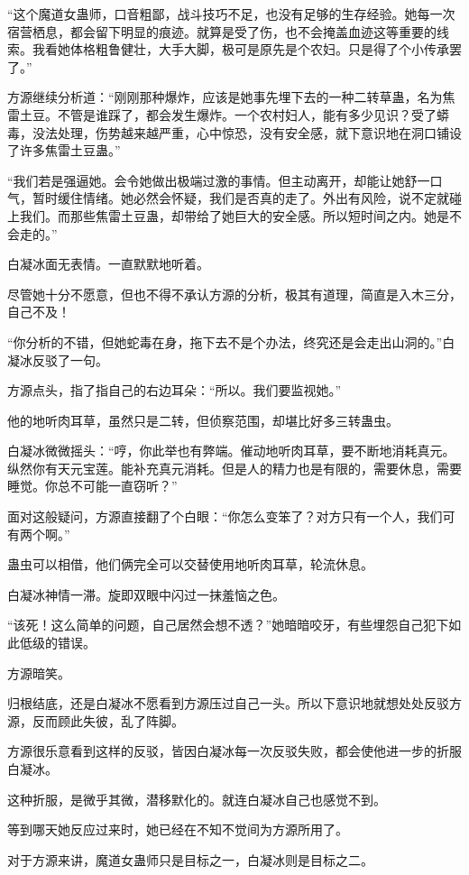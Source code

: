 \begin{this_body}
“这个魔道女蛊师，口音粗鄙，战斗技巧不足，也没有足够的生存经验。她每一次宿营栖息，都会留下明显的痕迹。就算是受了伤，也不会掩盖血迹这等重要的线索。我看她体格粗鲁健壮，大手大脚，极可是原先是个农妇。只是得了个小传承罢了。”

方源继续分析道：“刚刚那种爆炸，应该是她事先埋下去的一种二转草蛊，名为焦雷土豆。不管是谁踩了，都会发生爆炸。一个农村妇人，能有多少见识？受了蟒毒，没法处理，伤势越来越严重，心中惊恐，没有安全感，就下意识地在洞口铺设了许多焦雷土豆蛊。”

“我们若是强逼她。会令她做出极端过激的事情。但主动离开，却能让她舒一口气，暂时缓住情绪。她必然会怀疑，我们是否真的走了。外出有风险，说不定就碰上我们。而那些焦雷土豆蛊，却带给了她巨大的安全感。所以短时间之内。她是不会走的。”

白凝冰面无表情。一直默默地听着。

尽管她十分不愿意，但也不得不承认方源的分析，极其有道理，简直是入木三分，自己不及！

“你分析的不错，但她蛇毒在身，拖下去不是个办法，终究还是会走出山洞的。”白凝冰反驳了一句。

方源点头，指了指自己的右边耳朵：“所以。我们要监视她。”

他的地听肉耳草，虽然只是二转，但侦察范围，却堪比好多三转蛊虫。

白凝冰微微摇头：“哼，你此举也有弊端。催动地听肉耳草，要不断地消耗真元。纵然你有天元宝莲。能补充真元消耗。但是人的精力也是有限的，需要休息，需要睡觉。你总不可能一直窃听？”

面对这般疑问，方源直接翻了个白眼：“你怎么变笨了？对方只有一个人，我们可有两个啊。”

蛊虫可以相借，他们俩完全可以交替使用地听肉耳草，轮流休息。

白凝冰神情一滞。旋即双眼中闪过一抹羞恼之色。

“该死！这么简单的问题，自己居然会想不透？”她暗暗咬牙，有些埋怨自己犯下如此低级的错误。

方源暗笑。

归根结底，还是白凝冰不愿看到方源压过自己一头。所以下意识地就想处处反驳方源，反而顾此失彼，乱了阵脚。

方源很乐意看到这样的反驳，皆因白凝冰每一次反驳失败，都会使他进一步的折服白凝冰。

这种折服，是微乎其微，潜移默化的。就连白凝冰自己也感觉不到。

等到哪天她反应过来时，她已经在不知不觉间为方源所用了。

对于方源来讲，魔道女蛊师只是目标之一，白凝冰则是目标之二。


\end{this_body}
